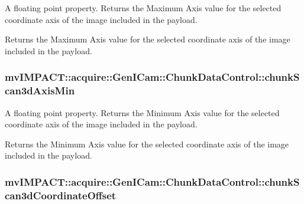 A floating point property. Returns the Maximum Axis value for the selected coordinate axis of the image included in the payload. 

Returns the Maximum Axis value for the selected coordinate axis of the image included in the payload. \hypertarget{classmv_i_m_p_a_c_t_1_1acquire_1_1_gen_i_cam_1_1_chunk_data_control_ab3e60dd32a90d506e0ae169d38f0215a}{
\subsubsection[{chunk\+Scan3d\+Axis\+Min}]{ mv\+I\+M\+P\+A\+C\+T\+::acquire\+::\+Gen\+I\+Cam\+::\+Chunk\+Data\+Control\+::chunk\+Scan3d\+Axis\+Min}}\label{classmv_i_m_p_a_c_t_1_1acquire_1_1_gen_i_cam_1_1_chunk_data_control_ab3e60dd32a90d506e0ae169d38f0215a}


A floating point property. Returns the Minimum Axis value for the selected coordinate axis of the image included in the payload. 

Returns the Minimum Axis value for the selected coordinate axis of the image included in the payload. \hypertarget{classmv_i_m_p_a_c_t_1_1acquire_1_1_gen_i_cam_1_1_chunk_data_control_a18a1e19081d8b40f6f297abf6b68fc5c}{
\subsubsection[{chunk\+Scan3d\+Coordinate\+Offset}]{ mv\+I\+M\+P\+A\+C\+T\+::acquire\+::\+Gen\+I\+Cam\+::\+Chunk\+Data\+Control\+::chunk\+Scan3d\+Coordinate\+Offset}}\label{classmv_i_m_p_a_c_t_1_1acquire_1_1_gen_i_cam_1_1_chunk_data_control_a18a1e19081d8b40f6f297abf6b68fc5c}


